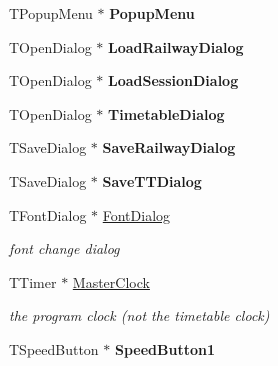 \begin{DoxyCompactItemize}
\item 
\mbox{\label{class_t_interface_ac0962233c50c6c67c55b71b54b634b9b}} 
T\+Popup\+Menu $\ast$ {\bfseries Popup\+Menu}
\item 
\mbox{\label{class_t_interface_ae2ab1b35577d8792f335abf9e79a4993}} 
T\+Open\+Dialog $\ast$ {\bfseries Load\+Railway\+Dialog}
\item 
\mbox{\label{class_t_interface_ae32059dc470055869c4a80f3a6bb2d89}} 
T\+Open\+Dialog $\ast$ {\bfseries Load\+Session\+Dialog}
\item 
\mbox{\label{class_t_interface_a758b51dda35130516245695b75927540}} 
T\+Open\+Dialog $\ast$ {\bfseries Timetable\+Dialog}
\item 
\mbox{\label{class_t_interface_a87004256f6d88054b975e72245b2f422}} 
T\+Save\+Dialog $\ast$ {\bfseries Save\+Railway\+Dialog}
\item 
\mbox{\label{class_t_interface_a3128e74692773ba42cbd127dfdbb190e}} 
T\+Save\+Dialog $\ast$ {\bfseries Save\+T\+T\+Dialog}
\item 
\mbox{\label{class_t_interface_a60a9276c65b1612112ea2dd020ea353c}} 
T\+Font\+Dialog $\ast$ \mbox{\hyperlink{class_t_interface_a60a9276c65b1612112ea2dd020ea353c}{Font\+Dialog}}
\begin{DoxyCompactList}\small\item\em font change dialog \end{DoxyCompactList}\item 
\mbox{\label{class_t_interface_a86ed4cb82f825abe93c1df870d2bf4d2}} 
T\+Timer $\ast$ \mbox{\hyperlink{class_t_interface_a86ed4cb82f825abe93c1df870d2bf4d2}{Master\+Clock}}
\begin{DoxyCompactList}\small\item\em the program clock (not the timetable clock) \end{DoxyCompactList}\item 
\mbox{\label{class_t_interface_aec3fdfb6671fe92b1858d1deb5d9156a}} 
T\+Speed\+Button $\ast$ {\bfseries Speed\+Button1}

\end{DoxyCompactItemize}
